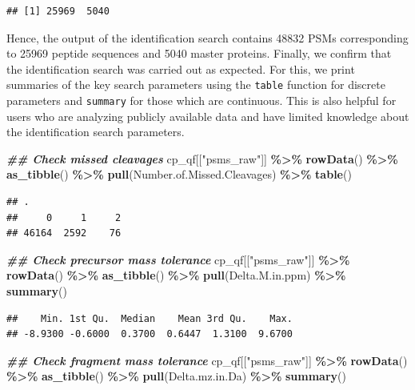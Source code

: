 \documentclass[9pt,a4paper,]{extarticle}
\newenvironment{Shaded}{\begin{snugshade}}{\end{snugshade}}
\newcommand{\DocumentationTok}[1]{\textcolor[rgb]{0.56,0.35,0.01}{\textbf{\textit{#1}}}}
\newcommand{\FunctionTok}[1]{\textcolor[rgb]{0.13,0.29,0.53}{\textbf{#1}}}
\newcommand{\NormalTok}[1]{#1}
\newcommand{\SpecialCharTok}[1]{\textcolor[rgb]{0.81,0.36,0.00}{\textbf{#1}}}
\newcommand{\StringTok}[1]{\textcolor[rgb]{0.31,0.60,0.02}{#1}}
\begin{document}
\begin{verbatim}
## [1] 25969  5040
\end{verbatim}

Hence, the output of the identification search contains
48832 PSMs corresponding to
25969 peptide sequences and
5040 master proteins. Finally, we
confirm that the identification search was carried out as expected. For this, we
print summaries of the key search parameters using the \texttt{table} function for
discrete parameters and \texttt{summary} for those which are continuous. This is also
helpful for users who are analyzing publicly available data and have limited
knowledge about the identification search parameters.

\begin{Shaded}
\begin{Highlighting}[]
\DocumentationTok{\#\# Check missed cleavages}
\NormalTok{cp\_qf[[}\StringTok{"psms\_raw"}\NormalTok{]] }\SpecialCharTok{\%\textgreater{}\%}
  \FunctionTok{rowData}\NormalTok{() }\SpecialCharTok{\%\textgreater{}\%} 
  \FunctionTok{as\_tibble}\NormalTok{() }\SpecialCharTok{\%\textgreater{}\%} 
  \FunctionTok{pull}\NormalTok{(Number.of.Missed.Cleavages) }\SpecialCharTok{\%\textgreater{}\%} 
  \FunctionTok{table}\NormalTok{()}
\end{Highlighting}
\end{Shaded}

\begin{verbatim}
## .
##     0     1     2 
## 46164  2592    76
\end{verbatim}

\begin{Shaded}
\begin{Highlighting}[]
\DocumentationTok{\#\# Check precursor mass tolerance}
\NormalTok{cp\_qf[[}\StringTok{"psms\_raw"}\NormalTok{]] }\SpecialCharTok{\%\textgreater{}\%} 
  \FunctionTok{rowData}\NormalTok{() }\SpecialCharTok{\%\textgreater{}\%} 
  \FunctionTok{as\_tibble}\NormalTok{() }\SpecialCharTok{\%\textgreater{}\%} 
  \FunctionTok{pull}\NormalTok{(Delta.M.in.ppm) }\SpecialCharTok{\%\textgreater{}\%} 
  \FunctionTok{summary}\NormalTok{()}
\end{Highlighting}
\end{Shaded}

\begin{verbatim}
##    Min. 1st Qu.  Median    Mean 3rd Qu.    Max. 
## -8.9300 -0.6000  0.3700  0.6447  1.3100  9.6700
\end{verbatim}

\begin{Shaded}
\begin{Highlighting}[]
\DocumentationTok{\#\# Check fragment mass tolerance}
\NormalTok{cp\_qf[[}\StringTok{"psms\_raw"}\NormalTok{]] }\SpecialCharTok{\%\textgreater{}\%} 
  \FunctionTok{rowData}\NormalTok{() }\SpecialCharTok{\%\textgreater{}\%} 
  \FunctionTok{as\_tibble}\NormalTok{() }\SpecialCharTok{\%\textgreater{}\%} 
  \FunctionTok{pull}\NormalTok{(Delta.mz.in.Da) }\SpecialCharTok{\%\textgreater{}\%} 
  \FunctionTok{summary}\NormalTok{()}
\end{Highlighting}
\end{Shaded}
\end{document}

